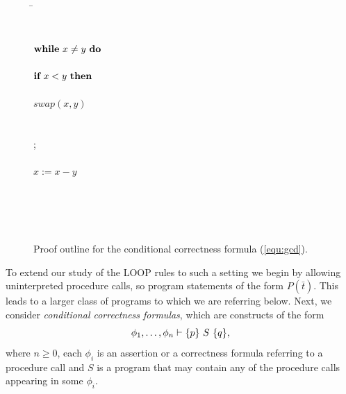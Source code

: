 \documentclass[manuscript, screen, review]{acmart}
\begin{document}
 \begin{figure}[ht]
 \begin{tabbing}
 \qquad\qquad                                       
\=  \\
\>  \\
\>      \\
\> $\mbox{$\mbox{{\bf while}\ } {x \neq y}\ \mbox{{\bf do}\ }$}$                          \\
\>  \qquad {} \\
\>  \qquad $\mbox{{\bf if}\ } x < y \mbox{\ {\bf then}\ }$                         \\
\> \qquad \qquad {} \\
\>  \qquad \qquad  $swap(x,y) $                         \\
\> \qquad \qquad {} \\
\> \qquad \qquad {} \\
\>  \qquad \FI; \\
\>  \qquad {} \\
\>  \qquad $x:= x-y$                         \\
\>  \qquad {} \\
\>  \OD                                      \\
\>  \\
\>  \\
\>  
\end{tabbing}
\caption{Proof outline for the conditional correctness formula (\ref{equ:gcd}).}
\label{fig:gcd}

\end{figure}

To extend our study of the LOOP rules to such a setting we
begin by allowing uninterpreted procedure calls, so program statements
of the form $P(\bar{t})$. This leads to a larger class of programs to
which we are referring below. Next, we consider \emph{conditional
  correctness formulas}, which are constructs of the form
\[
\phi_1, \dots, \phi_n \vdash \mbox{$\{{p}\}\ {S}\ \{{q}\}$},
\]
where $n \geq 0$, each $\phi_i$ is an assertion or a correctness
formula referring to a procedure call and $S$ is a program that may
contain any of the procedure calls appearing in some $\phi_i$.
\end{document}
